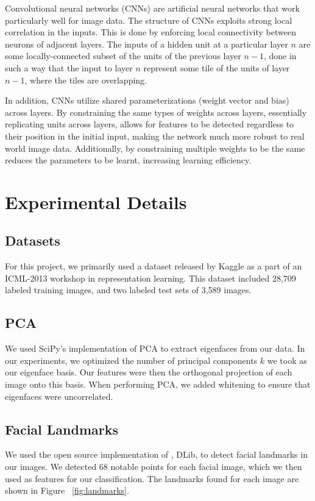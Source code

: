 \documentclass[10pt, twocolumn, twoside]{article}
\begin{document}
Convolutional neural networks (CNNs) are artificial neural networks that work particularly well for image data. The structure of CNNs exploits strong local correlation in the inputs. This is done by enforcing local connectivity between neurons of adjacent layers. The inputs of a hidden unit at a particular layer $n$ are some locally-connected subset of the units of the previous layer $n-1$, done in such a way that the input to layer $n$ represent some tile of the units of layer $n-1$, where the tiles are overlapping.

In addition, CNNs utilize shared parameterizations (weight vector and bias) across layers. By constraining the same types of weights across layers, essentially replicating units across layers, allows for features to be detected regardless to their position in the initial input, making the network much more robust to real world image data. Additionally, by constraining multiple weights to be the same reduces the parameters to be learnt, increasing learning efficiency.

\section{Experimental Details}

\subsection{Datasets}

For this project, we primarily used a dataset released by Kaggle as a part of an
ICML-2013 workshop in representation learning. This dataset included 28,709 labeled
training images, and two labeled test sets of 3,589 images.

\subsection{PCA}
We used SciPy's implementation of PCA to extract eigenfaces from our data.
In our experiments, we optimized the number of principal components $k$ we took as
our eigenface basis. Our features were then the orthogonal projection of each image
onto this basis. When performing PCA, we added whitening to ensure that eigenfaces
were uncorrelated.

\subsection{Facial Landmarks}
We used the open source implementation of \cite{Kazemi}, DLib, to detect facial
landmarks in our images. We detected 68 notable points for each facial image, which
we then used as features for our classification. The landmarks found for each image
are shown in Figure ~\ref{fig:landmarks}.
\end{document}
